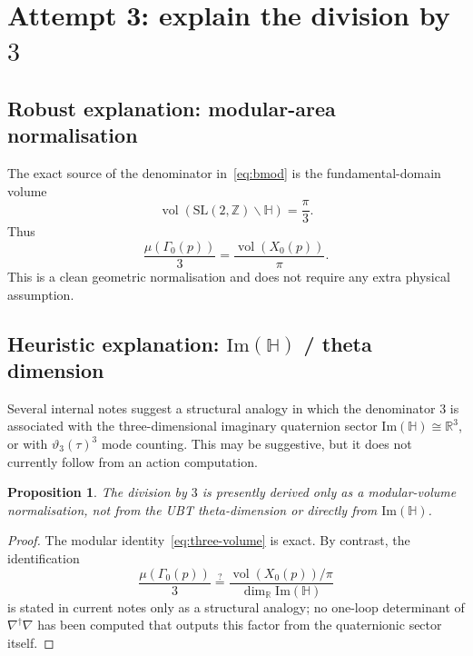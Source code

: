 \documentclass[12pt,a4paper]{article}
\newtheorem{proposition}{Proposition}[section]
\theoremstyle{remark}
\begin{document}
\section{Attempt 3: explain the division by $3$}

\subsection{Robust explanation: modular-area normalisation}

The exact source of the denominator in~\eqref{eq:bmod} is the fundamental-domain
volume
\begin{equation}
  \operatorname{vol}(\mathrm{SL}(2,\mathbb{Z})\backslash\mathbb{H})=\frac{\pi}{3}.
  \label{eq:fundvol}
\end{equation}
Thus
\begin{equation}
  \frac{\mu(\Gamma_0(p))}{3}
  =
  \frac{\operatorname{vol}(X_0(p))}{\pi}.
  \label{eq:three-volume}
\end{equation}
This is a clean geometric normalisation and does not require any extra physical
assumption.

\subsection{Heuristic explanation: $\mathrm{Im}(\mathbb{H})$ / theta dimension}

Several internal notes suggest a structural analogy in which the denominator $3$
is associated with the three-dimensional imaginary quaternion sector
$\mathrm{Im}(\mathbb{H})\cong\mathbb{R}^3$, or with $\vartheta_3(\tau)^3$ mode
counting.  This may be suggestive, but it does not currently follow from an
action computation.

\begin{proposition}
The division by $3$ is presently derived only as a modular-volume normalisation,
not from the UBT theta-dimension or directly from $\mathrm{Im}(\mathbb{H})$.
\end{proposition}

\begin{proof}
The modular identity~\eqref{eq:three-volume} is exact.  By contrast, the
identification
\[
  \frac{\mu(\Gamma_0(p))}{3}
  \stackrel{?}{=}
  \frac{\operatorname{vol}(X_0(p))/\pi}{\dim_{\mathbb{R}}\mathrm{Im}(\mathbb{H})}
\]
is stated in current notes only as a structural analogy; no one-loop determinant
of $\nabla^\dagger\nabla$ has been computed that outputs this factor from the
quaternionic sector itself.
\end{proof}
\end{document}
